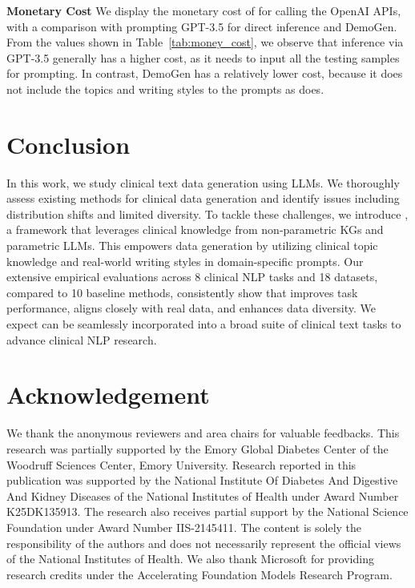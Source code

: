 \noindent \textbf{Monetary Cost}
\label{sec:apd_cost}
We display the monetary cost of {\ours} for calling the OpenAI APIs, with a comparison with prompting GPT-3.5 for direct inference and DemoGen. From the values shown in Table~\ref{tab:money_cost}, we observe that inference via GPT-3.5 generally has a higher cost, as it needs to input all the testing samples for prompting. In contrast, DemoGen has a relatively lower cost, because it does not include the topics and writing styles to the prompts as {\ours} does.

\section{Conclusion}

In this work, we study clinical text data generation using LLMs. We thoroughly assess existing methods for clinical data generation and identify issues including distribution shifts and limited diversity. 
To tackle these challenges, we introduce {\ours}, a  framework that leverages clinical knowledge from non-parametric KGs and parametric LLMs. 
This empowers data generation by utilizing clinical topic knowledge and real-world writing styles in domain-specific prompts. 
Our extensive empirical evaluations across 8 clinical NLP tasks and 18 datasets, compared to 10 baseline methods, consistently show that {\ours} improves task performance, aligns closely with real data, and enhances data diversity. 
We expect {\ours} can be seamlessly incorporated into a broad suite of clinical text tasks to advance clinical NLP research.%
\section*{Acknowledgement}
We thank the anonymous reviewers and area chairs for valuable feedbacks. 
This research was partially supported by the Emory Global Diabetes Center of the Woodruff Sciences Center, Emory University. Research reported in this publication was supported by the National Institute Of Diabetes And Digestive And Kidney Diseases of the National Institutes of Health under Award Number K25DK135913. 
The research also receives partial support by the National Science Foundation under Award Number IIS-2145411. The content is solely the responsibility of the authors and does not necessarily represent the official views of the National Institutes of Health.
We also thank Microsoft for providing research credits under the Accelerating Foundation Models Research Program.

